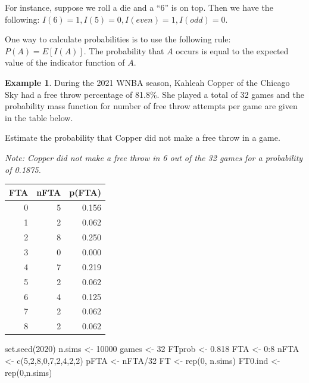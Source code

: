 \documentclass[
  11pt,
]{book}
\newenvironment{Shaded}{\begin{snugshade}}{\end{snugshade}}
\newcommand{\DecValTok}[1]{\textcolor[rgb]{0.00,0.00,0.81}{#1}}
\newcommand{\FloatTok}[1]{\textcolor[rgb]{0.00,0.00,0.81}{#1}}
\newcommand{\FunctionTok}[1]{\textcolor[rgb]{0.00,0.00,0.00}{#1}}
\newcommand{\NormalTok}[1]{#1}
\newcommand{\OtherTok}[1]{\textcolor[rgb]{0.56,0.35,0.01}{#1}}
\newcommand{\SpecialCharTok}[1]{\textcolor[rgb]{0.00,0.00,0.00}{#1}}
\theoremstyle{definition}
\theoremstyle{definition}
\newtheorem{example}{Example}[chapter]
\theoremstyle{definition}
\theoremstyle{definition}
\theoremstyle{remark}
\begin{document}
For instance, suppose we roll a die and a ``6'' is on top. Then we have the following: \(I(6)=1, I(5)=0, I(even)=1, I(odd)=0\).

One way to calculate probabilities is to use the following rule: \(P(A) = E[I(A)]\). The probability that \(A\) occurs is equal to the expected value of the indicator function of \(A\).

\begin{example}
During the 2021 WNBA season, Kahleah Copper of the Chicago Sky had a free throw percentage of 81.8\%. She played a total of 32 games and the probability mass function for number of free throw attempts per game are given in the table below.

Estimate the probability that Copper did not make a free throw in a game.

\emph{Note: Copper did not make a free throw in 6 out of the 32 games for a probability of 0.1875.}
\end{example}

\begin{table}[H]
\centering
\begin{tabular}{rrr}
\toprule
FTA & nFTA & p(FTA)\\
\midrule
0 & 5 & 0.156\\
1 & 2 & 0.062\\
2 & 8 & 0.250\\
3 & 0 & 0.000\\
4 & 7 & 0.219\\
5 & 2 & 0.062\\
6 & 4 & 0.125\\
7 & 2 & 0.062\\
8 & 2 & 0.062\\
\bottomrule
\end{tabular}
\end{table}

\begin{Shaded}
\begin{Highlighting}[]
\FunctionTok{set.seed}\NormalTok{(}\DecValTok{2020}\NormalTok{)}
\NormalTok{n.sims }\OtherTok{\textless{}{-}} \DecValTok{10000}
\NormalTok{games }\OtherTok{\textless{}{-}} \DecValTok{32}
\NormalTok{FTprob }\OtherTok{\textless{}{-}} \FloatTok{0.818}
\NormalTok{FTA }\OtherTok{\textless{}{-}} \DecValTok{0}\SpecialCharTok{:}\DecValTok{8}
\NormalTok{nFTA }\OtherTok{\textless{}{-}} \FunctionTok{c}\NormalTok{(}\DecValTok{5}\NormalTok{,}\DecValTok{2}\NormalTok{,}\DecValTok{8}\NormalTok{,}\DecValTok{0}\NormalTok{,}\DecValTok{7}\NormalTok{,}\DecValTok{2}\NormalTok{,}\DecValTok{4}\NormalTok{,}\DecValTok{2}\NormalTok{,}\DecValTok{2}\NormalTok{)}
\NormalTok{pFTA }\OtherTok{\textless{}{-}}\NormalTok{ nFTA}\SpecialCharTok{/}\DecValTok{32}
\NormalTok{FT }\OtherTok{\textless{}{-}} \FunctionTok{rep}\NormalTok{(}\DecValTok{0}\NormalTok{, n.sims)}
\NormalTok{FT0.ind }\OtherTok{\textless{}{-}} \FunctionTok{rep}\NormalTok{(}\DecValTok{0}\NormalTok{,n.sims)}
\end{Highlighting}
\end{Shaded}
\end{document}
